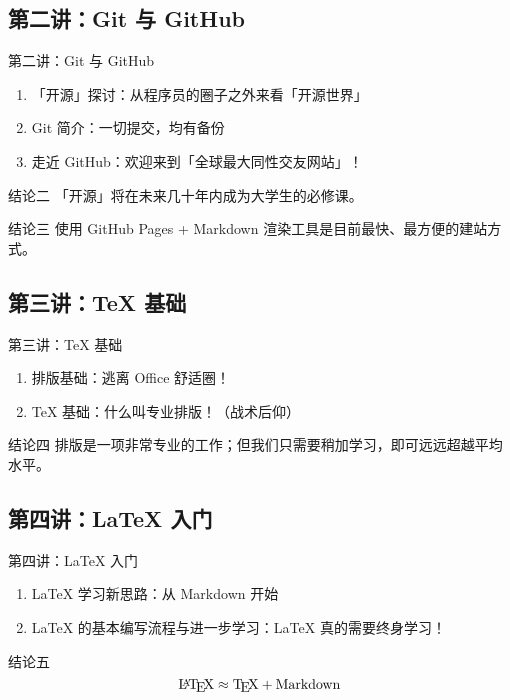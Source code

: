 \documentclass{beamer}
\begin{document}
\subsection{第二讲：Git 与 GitHub}
\begin{frame}{第二讲：Git 与 GitHub}
\begin{enumerate}
    \item 「开源」探讨：从程序员的圈子之外来看「开源世界」
    \item Git 简介：一切提交，均有备份
    \item 走近 GitHub：欢迎来到「全球最大同性交友网站」！
\end{enumerate}

\begin{block}{结论二}
「开源」将在未来几十年内成为大学生的必修课。
\end{block}

\begin{block}{结论三}
使用 GitHub Pages + Markdown 渲染工具是目前最快、最方便的建站方式。
\end{block}

\end{frame}

\subsection{第三讲：\TeX{} 基础}
\begin{frame}{第三讲：\TeX{} 基础}
\begin{enumerate}
    \item 排版基础：逃离 Office 舒适圈！
    \item \TeX{} 基础：什么叫专业排版！（战术后仰）
\end{enumerate}

\begin{block}{结论四}
排版是一项非常专业的工作；但我们只需要稍加学习，即可远远超越平均水平。
\end{block}
\end{frame}

\subsection{第四讲：\LaTeX{} 入门}
\begin{frame}{第四讲：\LaTeX{} 入门}
\begin{enumerate}
    \item \LaTeX{} 学习新思路：从 Markdown 开始
    \item \LaTeX{} 的基本编写流程与进一步学习：\LaTeX{} 真的需要终身学习！
\end{enumerate}

\begin{block}{结论五}
\[\text{\LaTeX}\approx\text{\TeX}+\text{Markdown}\]
\end{block}
\end{frame}
\end{document}
